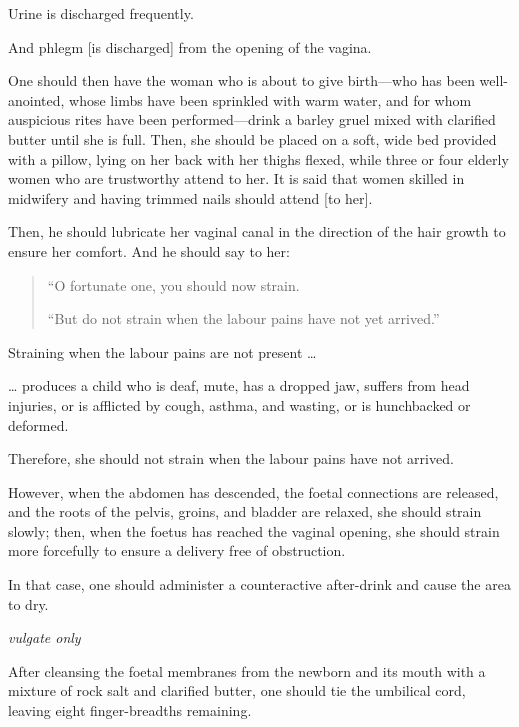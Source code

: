 \begin{translation}
\begin{tt}
Urine is discharged frequently.

And phlegm [is discharged] from the opening of the vagina.

\item[8]

One should then have the woman who is about to give birth---who has been
well-anointed, whose limbs have been sprinkled with warm water, and for
whom auspicious rites have been performed---drink a barley gruel mixed
with clarified butter until she is full. Then, she should be placed on
a soft, wide bed provided with a pillow, lying on her back with her
thighs flexed, while three or four elderly women who are trustworthy
attend to her. It is said that women skilled in midwifery and having
trimmed nails should attend [to her].

\item[9]

Then, he should lubricate her vaginal canal in the direction of the hair
growth to ensure her comfort. And he should say to her: 
\begin{quote}
“O fortunate
one, you should now strain.

“But do not strain when the labour pains have not yet arrived.”
\end{quote}

Straining when the labour pains are not present \ldots

\ldots{} produces a child who is deaf, mute, has a dropped jaw, suffers
from head injuries, or is afflicted by cough, asthma, and wasting, or is
hunchbacked or deformed.

Therefore, she should not strain when the labour pains have not
arrived.

However, when the abdomen has descended, the foetal connections are
released, and the roots of the pelvis, groins, and bladder are relaxed,
she should strain slowly; then, when the foetus has reached the vaginal
opening, she should strain more forcefully to ensure a delivery free of
obstruction.

\item[10]

In that case, one should administer a counteractive after-drink and
cause the area to dry.

\item[11] \emph{vulgate only}

\item[12]

After cleansing the foetal membranes from the newborn and its mouth with
a mixture of rock salt and clarified butter, one should tie the
umbilical cord, leaving eight finger-breadths remaining.


\end{tt}
\end{translation}
